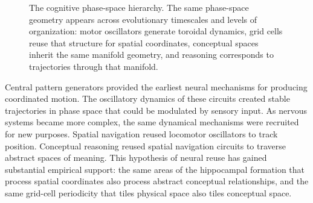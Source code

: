 \documentclass[11pt, a4paper]{article}
\theoremstyle{plain}
\theoremstyle{definition}
\theoremstyle{remark}
\begin{document}
\begin{figure}[h]
\centering
{}
\caption{The cognitive phase-space hierarchy. The same phase-space geometry appears
across evolutionary timescales and levels of organization: motor oscillators generate
toroidal dynamics, grid cells reuse that structure for spatial coordinates, conceptual
spaces inherit the same manifold geometry, and reasoning corresponds to trajectories
through that manifold.}
\end{figure}

Central pattern generators provided the earliest neural mechanisms for producing
coordinated motion. The oscillatory dynamics of these circuits created stable trajectories
in phase space that could be modulated by sensory input. As nervous systems became more
complex, the same dynamical mechanisms were recruited for new purposes. Spatial
navigation reused locomotor oscillators to track position. Conceptual reasoning reused
spatial navigation circuits to traverse abstract spaces of meaning. This hypothesis of
neural reuse has gained substantial empirical support: the same areas of the hippocampal
formation that process spatial coordinates also process abstract conceptual relationships,
and the same grid-cell periodicity that tiles physical space also tiles conceptual space.
\end{document}
